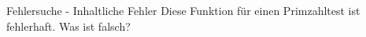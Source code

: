 \begin{task}{Fehlersuche - Inhaltliche Fehler}
    Diese Funktion für einen Primzahltest ist fehlerhaft. Was ist falsch?
    
    
    \begin{solution}
    \end{solution}
    
\end{task}
\newpage
